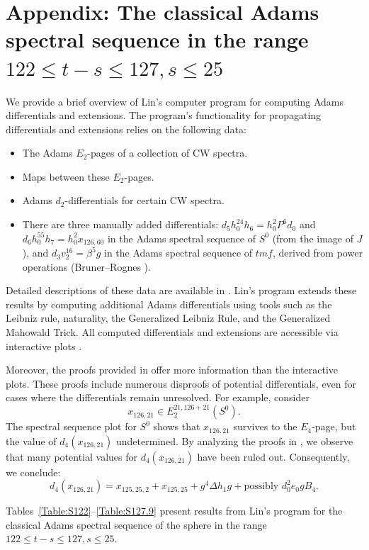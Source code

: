 \section{Appendix: The classical Adams spectral sequence in the range $122 \le t-s \le 127, s \le 25$} \label{sec:App}

We provide a brief overview of Lin's computer program for computing Adams differentials and extensions. The program's functionality for propagating differentials and extensions relies on the following data:
\begin{itemize}
    \item The Adams $E_2$-pages of a collection of CW spectra.
    \item Maps between these $E_2$-pages.
    \item Adams $d_2$-differentials for certain CW spectra.
    \item There are three manually added differentials: $d_5 h_0^{24}h_6=h_0^2P^6d_0$ and\\
 $d_6 h_0^{55}h_7=h_0^2x_{126,60}$ in the Adams spectral sequence of $S^0$ (from the image of $J$), and $d_3 v_2^{16}=\beta^5g$ in the Adams spectral sequence of $\mathit{tmf}$, derived from power operations (Bruner--Rognes \cite{BR21}).
\end{itemize}

Detailed descriptions of these data are available in \cite{LWXZenodo}. Lin's program extends these results by computing additional Adams differentials using tools such as the Leibniz rule, naturality, the Generalized Leibniz Rule, and the Generalized Mahowald Trick. All computed differentials and extensions are accessible via interactive plots \cite{LinPlot}.

Moreover, the proofs provided in \cite{LWXZenodo} offer more information than the interactive plots. These proofs include numerous disproofs of potential differentials, even for cases where the differentials remain unresolved. For example, consider 
$$x_{126,21}\in E_2^{21,126+21}(S^0).$$
The spectral sequence plot for $S^0$ shows that $x_{126,21}$ survives to the $E_4$-page, but the value of $d_4(x_{126,21})$ undetermined. By analyzing the proofs in \cite{LWXZenodo}, we observe that many potential values for $d_4(x_{126,21})$ have been ruled out. Consequently, we conclude:
$$d_4(x_{126,21})=x_{125,25,2}+x_{125,25}+g^4\Delta h_1g+\text{possibly }d_0^2e_0gB_4.$$

Tables~\ref{Table:S122}--\ref{Table:S127.9} present results from Lin's program for the classical Adams spectral sequence of the sphere in the range $122 \le t-s \le 127, s \le 25$.


